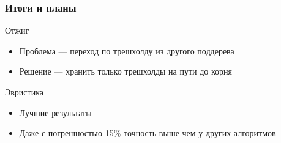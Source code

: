 \documentclass{beamer}
\begin{document}
\begin{frame} \frametitle{Итоги и планы}
    Отжиг
    \begin{itemize}
            \item Проблема --- переход по трешхолду из другого поддерева
            \item Решение --- хранить только трешхолды на пути до корня 
    \end{itemize}
    Эвристика
    \begin{itemize}
            \item Лучшие результаты
            \item Даже с погрешностью 15\% точность выше чем у других алгоритмов
    \end{itemize}
\end{frame}
\end{document}
